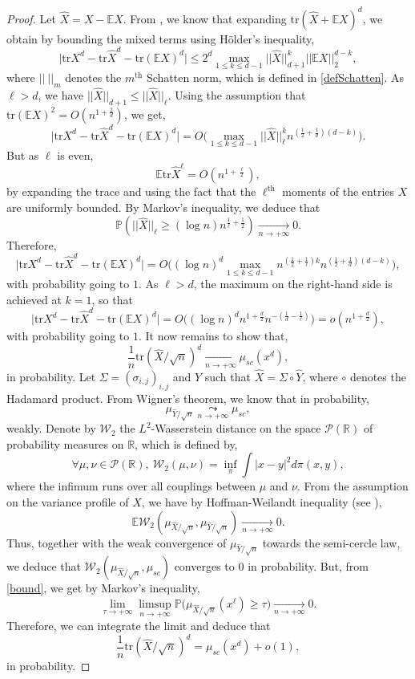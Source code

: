 \documentclass[aop,preprint]{imsart}
\newcommand\RR{\mathbb{R}}
\newcommand\PP{\mathbb{P}}
\newcommand\EE{\mathbb{E}}
\newcommand\tr{\mathrm{tr}}
\numberwithin{equation}{section}
\theoremstyle{definition}
\theoremstyle{plain}
\theoremstyle{remark}
\begin{document}
\begin{proof}Let $\hat X = X - \EE X$.
From \cite[Lemma 2.1 (9)]{LDPtr}, we know that expanding $\tr (\hat X+\EE X)^d$, we obtain by bounding the mixed terms using H\"older's inequality,
$$\big| \tr X^d - \tr {\hat X}^d - \tr (\EE X)^d \big| \leq 2^d \max_{1\leq k\leq d-1} || \hat X||_{d+1}^{k} || \EE X ||_2^{d-k},$$
where $|| \ ||_m$ denotes the $m^{\text{th}}$ Schatten norm, which is defined in \eqref{defSchatten}.
As $\ell> d$,  we have $ ||\hat X||_{d+1} \leq || \hat X ||_\ell$. Using the assumption  that $\tr (\EE X)^2 = O( n^{1+\frac{2}{d}})$, we get,
$$\big| \tr X^d - \tr {\hat X}^d - \tr (\EE X)^d \big| =  O\Big(  \max_{1\leq k\leq d-1} || \hat X ||_\ell^{k} n^{(\frac{1}{2}+\frac{1}{d})(d-k)}\Big).$$
But as $\ell$ is even,
\begin{equation} \label{bound}\EE \tr {\hat X}^\ell  = O( n^{1+\frac{\ell}{2}}),\end{equation}
by expanding the trace and using the fact that the $\ell^{\text{th}}$ moments of the entries $X$ are uniformly bounded.  By Markov's inequality, we deduce that 
$$ \PP( || \hat X||_\ell \geq (\log n) n^{\frac{1}{\ell}+\frac{1}{2}})\underset{n\to +\infty}{\longrightarrow} 0.$$
 Therefore, 
$$\big| \tr X^d - \tr {\hat X}^d - \tr (\EE X)^d \big| =  O\Big( (\log n)^d \max_{1\leq k\leq d-1} n^{(\frac{1}{2}+ \frac{1}{\ell})k} n^{(\frac{1}{2}+\frac{1}{d})(d-k)}\Big),$$
with probability going to $1$.
As $\ell>d$, the maximum on the right-hand side is achieved at $k=1$, so that
$$\big| \tr X^d - \tr {\hat X}^d - \tr (\EE X)^d \big| =  O\Big((\log n)^d n^{1+\frac{d}{2}}  n^{-(\frac{1}{d} -\frac{1}{\ell})}\Big) = o(n^{1+\frac{d}{2}}),$$
with probability going to $1$. It now remains to show that,
$$ \frac{1}{n} \tr ({\hat X}/\sqrt{n})^d \underset{n\to +\infty}{\longrightarrow}  \mu_{sc}(x^d),$$
in probability.  Let $\Sigma = (\sigma_{i,j})_{i,j}$ and $\hat Y$ such that $\hat X = \Sigma \circ  \hat Y$, where $\circ$ denotes the Hadamard product. From Wigner's theorem, we know that in probability, 
$$ \mu_{\hat Y/\sqrt{n}} \underset{n\to +\infty}{\leadsto} \mu_{sc},$$
weakly.  Denote by $\mathcal{W}_2$ the $L^2$-Wasserstein distance on the space $\mathcal{P}(\RR)$ of probability measures on $\RR$, which is defined by,
$$ \forall \mu,\nu \in \mathcal{P}(\RR), \ \mathcal{W}_2(\mu,\nu) = \inf_{\pi} \int |x-y|^2 d\pi(x,y),$$ 
where the infimum runs over all couplings between $\mu$ and $\nu$. From the assumption on the variance profile of $X$, we have by Hoffman-Weilandt inequality (see \cite[Theorem VI.4.1]{Bhatia}),
$$ \EE \mathcal{W}_2(\mu_{\hat X/\sqrt{n}}, \mu_{\hat Y/\sqrt{n}}) \underset{n\to +\infty}{\longrightarrow} 0.$$
Thus, together with the weak convergence of $\mu_{\hat Y/\sqrt{n}}$ towards the semi-cercle law, we deduce that $\mathcal{W}_2(\mu_{\hat X/\sqrt{n}}, \mu_{sc})$ converges to $0$ in probability. But, from \eqref{bound}, we get by Markov's inequality,
$$ \lim_{\tau \to +\infty} \limsup_{n\to +\infty} \PP\big (\mu_{\hat X/\sqrt{n}} (x^\ell) \geq \tau \big) \underset{n\to +\infty}{\longrightarrow} 0.$$
Therefore, we can integrate the limit and deduce that
$$ \frac{1}{n} \tr ({\hat X}/\sqrt{n})^d = \mu_{sc}(x^d) + o(1),$$
in probability. 


\end{proof}
\end{document}
